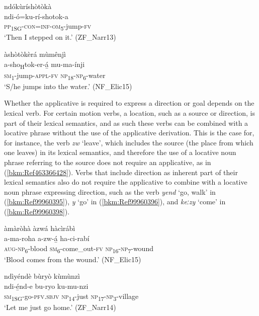 \ea
\label{bkm:Ref463363472}
\glll ndókùríshòtòkà\\
ndi-ó=ku-rí-shotok-a\\
\textsc{pp}\textsubscript{1SG}-\textsc{con}=\textsc{inf}-\textsc{om}\textsubscript{5}-jump-\textsc{fv}\\
\glt ‘Then I stepped on it.’ (ZF\_Narr13)
\z

\ea
\label{bkm:Ref463363486}
àshòtòkèrá mùmênjì\\
\gll a-sho\textsubscript{H}tok-er-á̲  mu-ma-ínji\\
\textsc{sm}\textsubscript{1}-jump-\textsc{appl}-\textsc{fv}  \textsc{np}\textsubscript{18}-\textsc{np}\textsubscript{6}-water\\
\glt ‘S/he jumps into the water.’ (NF\_Elic15)
\z

Whether the applicative is required to express a direction or goal depends on the lexical verb. For certain motion verbs, a location, such as a source or direction, is part of their lexical semantics, and as such these verbs can be combined with a locative phrase without the use of the applicative derivation. This is the case for, for instance, the verb \textit{zw} ‘leave’, which includes the source (the place from which one leaves) in its lexical semantics, and therefore the use of a locative noun phrase referring to the source does not require an applicative, as in (\ref{bkm:Ref463366428}). Verbs that include direction as inherent part of their lexical semantics also do not require the applicative to combine with a locative noun phrase expressing direction, such as the verb \textit{yend} ‘go, walk’ in (\ref{bkm:Ref99960395}), \textit{y} ‘go’ in (\ref{bkm:Ref99960396}), and \textit{keːzy} ‘come’ in (\ref{bkm:Ref99960398}).\largerpage

\ea
\label{bkm:Ref463366428}
àmàròhà àzwá hàcìrábì\\
\gll a-ma-roha    a-zw-á̲    ha-ci-rabí\\
\textsc{aug}-\textsc{np}\textsubscript{6}-blood  \textsc{sm}\textsubscript{6}-come\_out-\textsc{fv}  \textsc{np}\textsubscript{16}-\textsc{np}\textsubscript{7}-wound\\
\glt ‘Blood comes from the wound.’ (NF\_Elic15)
\z

\ea
\label{bkm:Ref99960395}
ndìyéndè bùryò kùmùnzì\\
\gll ndi-é̲nd-e    bu-ryo  ku-mu-nzi\\
\textsc{sm}\textsubscript{1SG}-go-\textsc{pfv}.\textsc{sbjv}  \textsc{np}\textsubscript{14}-just  \textsc{np}\textsubscript{17}-\textsc{np}\textsubscript{3}-village\\
\glt ‘Let me just go home.’ (ZF\_Narr14)
\z

